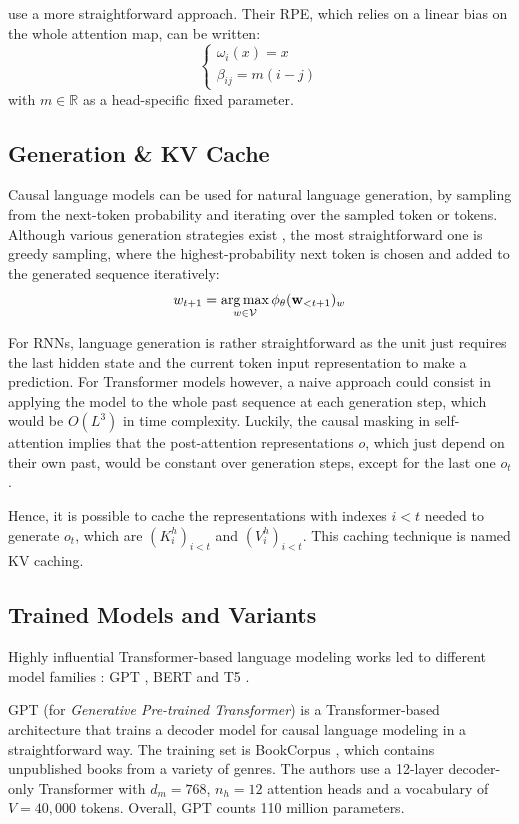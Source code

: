 \citet{alibi} use a more straightforward approach. Their RPE, which relies on a linear bias on the whole attention map, can be written:
$$
\begin{cases}
    \omega_i(x) = x \\
    \beta_{ij} = m (i-j)
\end{cases}
$$
with $m \in \mathbb{R}$ as a head-specific fixed parameter.

\subsection{Generation \& KV Cache}
\label{ssec:kv_cache}
Causal language models can be used for natural language generation, by sampling from the next-token probability and iterating over the sampled token or tokens. Although various generation strategies exist \citep{fan-etal-2018-hierarchical, wang2020contextual, nucleus_sampling}, the most straightforward one is greedy sampling, where the highest-probability next token is chosen and added to the generated sequence iteratively:
$$
w_{t+1} = \operatorname*{arg\,max}_{w \in \mathcal{V}}\phi_{\theta}(\mathbf{w}_{<t+1})_w
$$

For RNNs, language generation is rather straightforward as the unit just requires the last hidden state and the current token input representation to make a prediction. For Transformer models however, a naive approach could consist in applying the model to the whole past sequence at each generation step, which would be $O(L^3)$ in time complexity. Luckily, the causal masking in self-attention implies that the post-attention representations $o$, which just depend on their own past, would be constant over generation steps, except for the last one $o_t$.

Hence, it is possible to cache the representations with indexes $i < t$ needed to generate $o_t$, which are $(K^h_i)_{i<t}$ and $(V^h_i)_{i<t}$. This caching technique is named KV caching.

\subsection{Trained Models and Variants}
\label{sec:trained_models}
Highly influential Transformer-based language modeling works led to different model families : GPT \citep{Radford2018ImprovingLU}, BERT \citep{devlin-etal-2019-bert} and T5 \citep{2020t5}.

GPT (for \textit{Generative Pre-trained Transformer}) is a Transformer-based architecture that trains a decoder model for causal language modeling in a straightforward way. The training set is BookCorpus \citep{bookcorpus}, which contains unpublished books from a variety of genres. The authors use a 12-layer decoder-only Transformer with $d_m=768$, $n_h=12$ attention heads and a vocabulary of $V=40,000$ tokens. Overall, GPT counts 110 million parameters.

